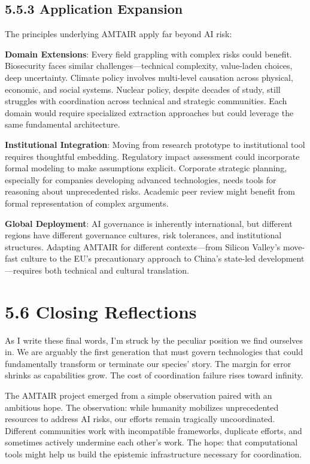 \documentclass[
  11pt,
  letterpaper,
]{book}
\begin{document}
\subsection{5.5.3 Application
Expansion}\label{sec-application-expansion}

The principles underlying AMTAIR apply far beyond AI risk:

\textbf{Domain Extensions}: Every field grappling with complex risks
could benefit. Biosecurity faces similar challenges---technical
complexity, value-laden choices, deep uncertainty. Climate policy
involves multi-level causation across physical, economic, and social
systems. Nuclear policy, despite decades of study, still struggles with
coordination across technical and strategic communities. Each domain
would require specialized extraction approaches but could leverage the
same fundamental architecture.

\textbf{Institutional Integration}: Moving from research prototype to
institutional tool requires thoughtful embedding. Regulatory impact
assessment could incorporate formal modeling to make assumptions
explicit. Corporate strategic planning, especially for companies
developing advanced technologies, needs tools for reasoning about
unprecedented risks. Academic peer review might benefit from formal
representation of complex arguments.

\textbf{Global Deployment}: AI governance is inherently international,
but different regions have different governance cultures, risk
tolerances, and institutional structures. Adapting AMTAIR for different
contexts---from Silicon Valley's move-fast culture to the EU's
precautionary approach to China's state-led development---requires both
technical and cultural translation.

\section{5.6 Closing Reflections}\label{sec-closing-reflections}

As I write these final words, I'm struck by the peculiar position we
find ourselves in. We are arguably the first generation that must govern
technologies that could fundamentally transform or terminate our
species' story. The margin for error shrinks as capabilities grow. The
cost of coordination failure rises toward infinity.

The AMTAIR project emerged from a simple observation paired with an
ambitious hope. The observation: while humanity mobilizes unprecedented
resources to address AI risks, our efforts remain tragically
uncoordinated. Different communities work with incompatible frameworks,
duplicate efforts, and sometimes actively undermine each other's work.
The hope: that computational tools might help us build the epistemic
infrastructure necessary for coordination.
\end{document}
